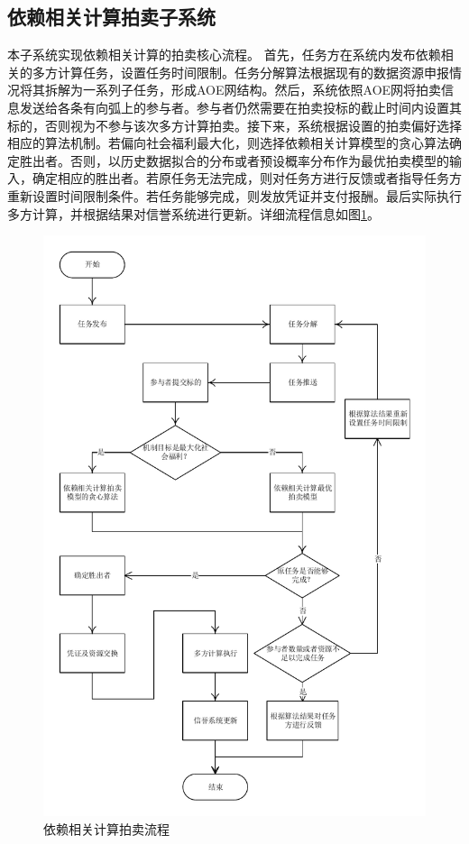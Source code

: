 \documentclass[promaster]{thesis-uestc}
\begin{document}
\subsection{依赖相关计算拍卖子系统}

本子系统实现依赖相关计算的拍卖核心流程。
首先，任务方在系统内发布依赖相关的多方计算任务，设置任务时间限制。任务分解算法根据现有的数据资源申报情况将其拆解为一系列子任务，形成AOE网结构。然后，系统依照AOE网将拍卖信息发送给各条有向弧上的参与者。参与者仍然需要在拍卖投标的截止时间内设置其标的，否则视为不参与该次多方计算拍卖。接下来，系统根据设置的拍卖偏好选择相应的算法机制。若偏向社会福利最大化，则选择依赖相关计算模型的贪心算法确定胜出者。否则，以历史数据拟合的分布或者预设概率分布作为最优拍卖模型的输入，确定相应的胜出者。若原任务无法完成，则对任务方进行反馈或者指导任务方重新设置时间限制条件。若任务能够完成，则发放凭证并支付报酬。最后实际执行多方计算，并根据结果对信誉系统进行更新。详细流程信息如图\ref{yilailiucheng}。

\begin{figure}[h]
    \includegraphics[width=330pt]{pic/yilaixiangguan.pdf}
    \caption{依赖相关计算拍卖流程}
    \label{yilailiucheng}
\end{figure}
\end{document}
